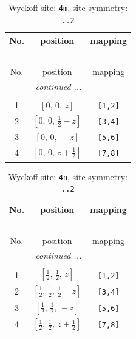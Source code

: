 \documentclass[fleqn,8pt]{jsarticle}
\begin{document}
\renewcommand{\arraystretch}{1.2}
\begin{longtable}{ccc}
\caption{Wyckoff site: {\tt 4m}, site symmetry: {\tt ..2}}
 \\
 \hline \hline
No. & position & mapping \\ \hline \endfirsthead

\multicolumn{2}{l}{\tablename\ \thetable{}} \\
 \hline \hline
No. & position & mapping \\ \hline \endhead

 \hline \hline
\multicolumn{2}{r}{\footnotesize\it continued ...} \\ \endfoot

 \hline \hline
\multicolumn{2}{r}{} \\ \endlastfoot

1 & $\left[ 0,\, 0,\, z \right]$ & {\tt [1,2]} \\ \hline
2 & $\left[ 0,\, 0,\, \frac{1}{2} - z \right]$ & {\tt [3,4]} \\ \hline
3 & $\left[ 0,\, 0,\, - z \right]$ & {\tt [5,6]} \\ \hline
4 & $\left[ 0,\, 0,\, z + \frac{1}{2} \right]$ & {\tt [7,8]} \\
\end{longtable}
\renewcommand{\arraystretch}{1.2}
\begin{longtable}{ccc}
\caption{Wyckoff site: {\tt 4n}, site symmetry: {\tt ..2}}
 \\
 \hline \hline
No. & position & mapping \\ \hline \endfirsthead

\multicolumn{2}{l}{\tablename\ \thetable{}} \\
 \hline \hline
No. & position & mapping \\ \hline \endhead

 \hline \hline
\multicolumn{2}{r}{\footnotesize\it continued ...} \\ \endfoot

 \hline \hline
\multicolumn{2}{r}{} \\ \endlastfoot

1 & $\left[ \frac{1}{2},\, \frac{1}{2},\, z \right]$ & {\tt [1,2]} \\ \hline
2 & $\left[ \frac{1}{2},\, \frac{1}{2},\, \frac{1}{2} - z \right]$ & {\tt [3,4]} \\ \hline
3 & $\left[ \frac{1}{2},\, \frac{1}{2},\, - z \right]$ & {\tt [5,6]} \\ \hline
4 & $\left[ \frac{1}{2},\, \frac{1}{2},\, z + \frac{1}{2} \right]$ & {\tt [7,8]} \\
\end{longtable}
\end{document}
